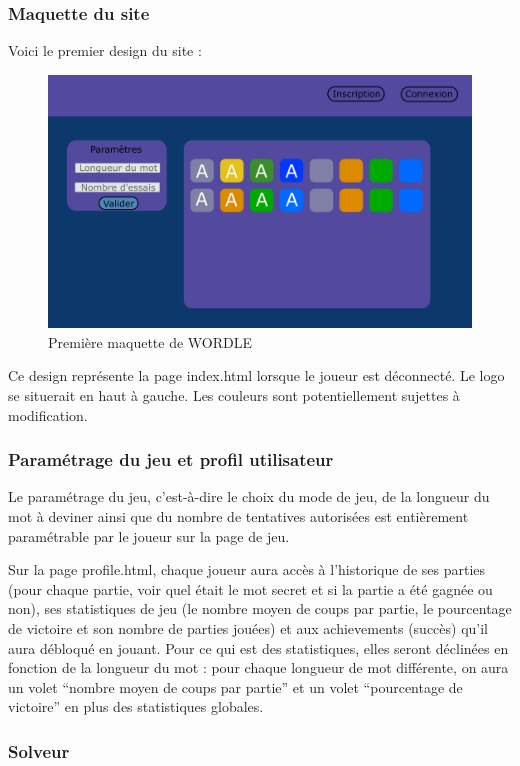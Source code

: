 \subsubsection{Maquette du site}
Voici le premier design du site :

\begin{figure}[h!]
\centering
\includegraphics[width=12cm]{figures/wordle_sketch.PNG}
\caption{Première maquette de WORDLE}
\end{figure}
Ce design représente la page index.html lorsque le joueur est déconnecté. Le logo se situerait en haut à gauche. Les couleurs sont potentiellement sujettes à modification.

\subsubsection{Paramétrage du jeu et profil utilisateur}
\tabto{1cm}Le paramétrage du jeu, c’est-à-dire le choix du mode de jeu, de la longueur du mot à deviner ainsi que du nombre de tentatives autorisées est entièrement paramétrable par le joueur sur la page de jeu.

\tabto{1cm}Sur la page profile.html, chaque joueur aura accès à l’historique de ses parties (pour chaque partie, voir quel était le mot secret et si la partie a été gagnée ou non), ses statistiques de jeu (le nombre moyen de coups par partie, le pourcentage de victoire et son nombre de parties jouées) et aux achievements (succès) qu’il aura débloqué en jouant. Pour ce qui est des statistiques, elles seront déclinées en fonction de la longueur du mot : pour chaque longueur de mot différente, on aura un volet “nombre moyen de coups par partie” et un volet “pourcentage de victoire” en plus des statistiques globales.

\subsubsection{Solveur}

